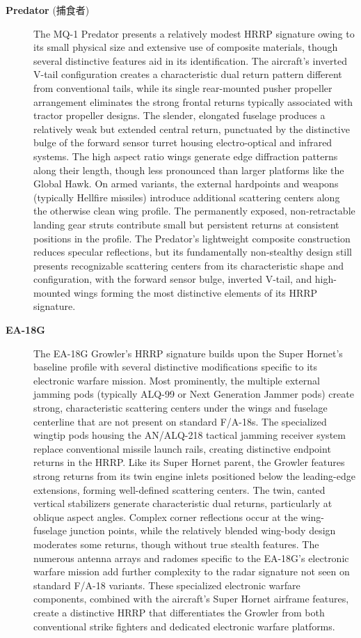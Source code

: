 {\begin{description}
    \item[\textbf{Predator} (捕食者)]
    The MQ-1 Predator presents a relatively modest HRRP signature owing to its small physical size and extensive use of composite materials, though several distinctive features aid in its identification. The aircraft's inverted V-tail configuration creates a characteristic dual return pattern different from conventional tails, while its single rear-mounted pusher propeller arrangement eliminates the strong frontal returns typically associated with tractor propeller designs. The slender, elongated fuselage produces a relatively weak but extended central return, punctuated by the distinctive bulge of the forward sensor turret housing electro-optical and infrared systems. The high aspect ratio wings generate edge diffraction patterns along their length, though less pronounced than larger platforms like the Global Hawk. On armed variants, the external hardpoints and weapons (typically Hellfire missiles) introduce additional scattering centers along the otherwise clean wing profile. The permanently exposed, non-retractable landing gear struts contribute small but persistent returns at consistent positions in the profile. The Predator's lightweight composite construction reduces specular reflections, but its fundamentally non-stealthy design still presents recognizable scattering centers from its characteristic shape and configuration, with the forward sensor bulge, inverted V-tail, and high-mounted wings forming the most distinctive elements of its HRRP signature.

    \item[\textbf{EA-18G}]
    The EA-18G Growler's HRRP signature builds upon the Super Hornet's baseline profile with several distinctive modifications specific to its electronic warfare mission. Most prominently, the multiple external jamming pods (typically ALQ-99 or Next Generation Jammer pods) create strong, characteristic scattering centers under the wings and fuselage centerline that are not present on standard F/A-18s. The specialized wingtip pods housing the AN/ALQ-218 tactical jamming receiver system replace conventional missile launch rails, creating distinctive endpoint returns in the HRRP. Like its Super Hornet parent, the Growler features strong returns from its twin engine inlets positioned below the leading-edge extensions, forming well-defined scattering centers. The twin, canted vertical stabilizers generate characteristic dual returns, particularly at oblique aspect angles. Complex corner reflections occur at the wing-fuselage junction points, while the relatively blended wing-body design moderates some returns, though without true stealth features. The numerous antenna arrays and radomes specific to the EA-18G's electronic warfare mission add further complexity to the radar signature not seen on standard F/A-18 variants. These specialized electronic warfare components, combined with the aircraft's Super Hornet airframe features, create a distinctive HRRP that differentiates the Growler from both conventional strike fighters and dedicated electronic warfare platforms.


\end{description}}
